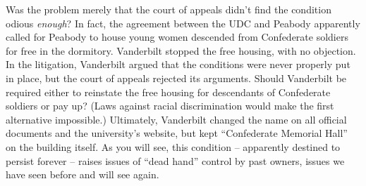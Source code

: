 Was the problem merely that the court of appeals didn't find the condition
odious \textit{enough}? In fact, the agreement between the UDC and Peabody
apparently called for Peabody to house young women descended from Confederate
soldiers for free in the dormitory.  Vanderbilt stopped the free housing, with
no objection.  In the litigation, Vanderbilt argued that the conditions were
never properly put in place, but the court of appeals rejected its arguments. 
Should Vanderbilt be required either to reinstate the free housing for
descendants of Confederate soldiers or pay up?  (Laws against racial
discrimination would make the first alternative impossible.)  Ultimately,
Vanderbilt changed the name on all official documents and the university's
website, but kept ``Confederate Memorial Hall'' on the building itself.  As you
will see, this condition -- apparently destined to persist forever -- raises
issues of ``dead hand'' control by past owners, issues we have seen before and
will see again.

